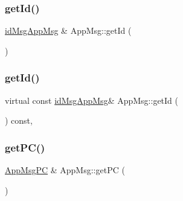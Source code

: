 \mbox{\label{classAppMsg_abd9e4fa4ce0b074123b4e0cf64f5d743}} 
\subsubsection{\texorpdfstring{get\+Id()}{getId()}\hspace{0.1cm}{\footnotesize\ttfamily [1/2]}}
{\footnotesize\ttfamily \hyperlink{AppMsg__m_8h_a0bd5e3a5ba85ac1fa0fd0fae34d903c1}{id\+Msg\+App\+Msg} \& App\+Msg\+::get\+Id (\begin{DoxyParamCaption}{ }\end{DoxyParamCaption})\hspace{0.3cm}{\ttfamily [virtual]}}

\mbox{\label{classAppMsg_a0a87f5d332044dcd5ce861f6bcfaf6b2}} 
\subsubsection{\texorpdfstring{get\+Id()}{getId()}\hspace{0.1cm}{\footnotesize\ttfamily [2/2]}}
{\footnotesize\ttfamily virtual const \hyperlink{AppMsg__m_8h_a0bd5e3a5ba85ac1fa0fd0fae34d903c1}{id\+Msg\+App\+Msg}\& App\+Msg\+::get\+Id (\begin{DoxyParamCaption}{ }\end{DoxyParamCaption}) const\hspace{0.3cm}{\ttfamily [inline]}, {\ttfamily [virtual]}}

\mbox{\label{classAppMsg_a50acdb9331a812120c945612e81cd04f}} 
\subsubsection{\texorpdfstring{get\+P\+C()}{getPC()}\hspace{0.1cm}{\footnotesize\ttfamily [1/2]}}
{\footnotesize\ttfamily \hyperlink{AppMsg__m_8h_abcd76636e4b750d033ffc348601dd7a2}{App\+Msg\+PC} \& App\+Msg\+::get\+PC (\begin{DoxyParamCaption}{ }\end{DoxyParamCaption})\hspace{0.3cm}{\ttfamily [virtual]}}

